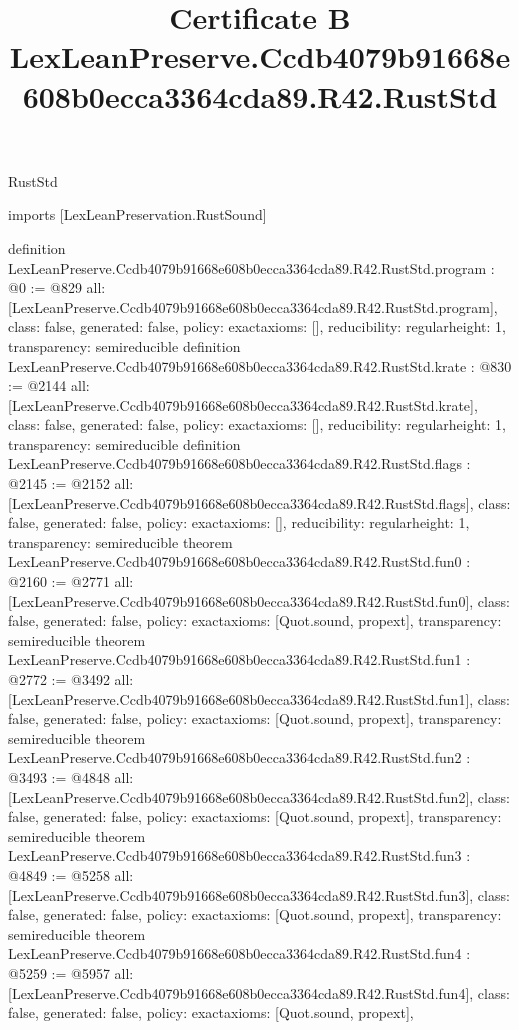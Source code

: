\begin{lexlean}{RustStd}
\title{Certificate B LexLeanPreserve.Ccdb4079b91668e608b0ecca3364cda89.R42.RustStd}
\begin{coremodule}
imports [LexLeanPreservation.RustSound]

definition LexLeanPreserve.Ccdb4079b91668e608b0ecca3364cda89.R42.RustStd.program : @0 := @829 {
  all: [LexLeanPreserve.Ccdb4079b91668e608b0ecca3364cda89.R42.RustStd.program],
  class: false,
  generated: false,
  policy: exact{axioms: []},
  reducibility: regular{height: 1},
  transparency: semireducible
}
definition LexLeanPreserve.Ccdb4079b91668e608b0ecca3364cda89.R42.RustStd.krate : @830 := @2144 {
  all: [LexLeanPreserve.Ccdb4079b91668e608b0ecca3364cda89.R42.RustStd.krate],
  class: false,
  generated: false,
  policy: exact{axioms: []},
  reducibility: regular{height: 1},
  transparency: semireducible
}
definition LexLeanPreserve.Ccdb4079b91668e608b0ecca3364cda89.R42.RustStd.flags : @2145 := @2152 {
  all: [LexLeanPreserve.Ccdb4079b91668e608b0ecca3364cda89.R42.RustStd.flags],
  class: false,
  generated: false,
  policy: exact{axioms: []},
  reducibility: regular{height: 1},
  transparency: semireducible
}
theorem LexLeanPreserve.Ccdb4079b91668e608b0ecca3364cda89.R42.RustStd.fun0 : @2160 := @2771 {
  all: [LexLeanPreserve.Ccdb4079b91668e608b0ecca3364cda89.R42.RustStd.fun0],
  class: false,
  generated: false,
  policy: exact{axioms: [Quot.sound, propext]},
  transparency: semireducible
}
theorem LexLeanPreserve.Ccdb4079b91668e608b0ecca3364cda89.R42.RustStd.fun1 : @2772 := @3492 {
  all: [LexLeanPreserve.Ccdb4079b91668e608b0ecca3364cda89.R42.RustStd.fun1],
  class: false,
  generated: false,
  policy: exact{axioms: [Quot.sound, propext]},
  transparency: semireducible
}
theorem LexLeanPreserve.Ccdb4079b91668e608b0ecca3364cda89.R42.RustStd.fun2 : @3493 := @4848 {
  all: [LexLeanPreserve.Ccdb4079b91668e608b0ecca3364cda89.R42.RustStd.fun2],
  class: false,
  generated: false,
  policy: exact{axioms: [Quot.sound, propext]},
  transparency: semireducible
}
theorem LexLeanPreserve.Ccdb4079b91668e608b0ecca3364cda89.R42.RustStd.fun3 : @4849 := @5258 {
  all: [LexLeanPreserve.Ccdb4079b91668e608b0ecca3364cda89.R42.RustStd.fun3],
  class: false,
  generated: false,
  policy: exact{axioms: [Quot.sound, propext]},
  transparency: semireducible
}
theorem LexLeanPreserve.Ccdb4079b91668e608b0ecca3364cda89.R42.RustStd.fun4 : @5259 := @5957 {
  all: [LexLeanPreserve.Ccdb4079b91668e608b0ecca3364cda89.R42.RustStd.fun4],
  class: false,
  generated: false,
  policy: exact{axioms: [Quot.sound, propext]},
}
\end{coremodule}
\end{lexlean}
